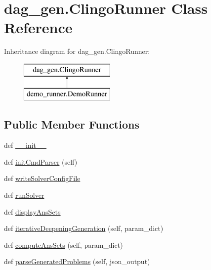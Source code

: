 \hypertarget{classdag__gen_1_1_clingo_runner}{}\section{dag\+\_\+gen.\+Clingo\+Runner Class Reference}
\label{classdag__gen_1_1_clingo_runner}
Inheritance diagram for dag\+\_\+gen.\+Clingo\+Runner\+:\begin{figure}[H]
\begin{center}
\leavevmode
\includegraphics[height=2.000000cm]{classdag__gen_1_1_clingo_runner}
\end{center}
\end{figure}
\subsection*{Public Member Functions}
\begin{DoxyCompactItemize}
\item 
def \hyperlink{classdag__gen_1_1_clingo_runner_a7441ae2288ff73302b0ee7e930639ab3}{\+\_\+\+\_\+init\+\_\+\+\_\+}
\item 
def \hyperlink{classdag__gen_1_1_clingo_runner_af9fe9a18de802ad6ae4bbde932f13f7d}{init\+Cmd\+Parser} (self)
\item 
def \hyperlink{classdag__gen_1_1_clingo_runner_ab989b98542007db0859beac9596f4923}{write\+Solver\+Config\+File}
\item 
def \hyperlink{classdag__gen_1_1_clingo_runner_ab2e79a582f9fd5003e83ecfca09612a4}{run\+Solver}
\item 
def \hyperlink{classdag__gen_1_1_clingo_runner_a73440fbbc4ff2cae5936e1b8e62da47e}{display\+Ans\+Sets}
\item 
def \hyperlink{classdag__gen_1_1_clingo_runner_aae48d9486b94f29592ea36d8fddd2962}{iterative\+Deepening\+Generation} (self, param\+\_\+dict)
\item 
def \hyperlink{classdag__gen_1_1_clingo_runner_a1cf014fe7656bdeffb3c431e3d542358}{compute\+Ans\+Sets} (self, param\+\_\+dict)
\item 
def \hyperlink{classdag__gen_1_1_clingo_runner_a7468c2faec4b7d8460a9c2ece1e9c243}{parse\+Generated\+Problems} (self, json\+\_\+output)
\end{DoxyCompactItemize}
